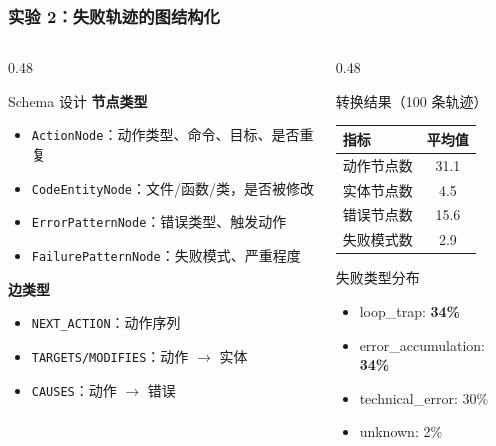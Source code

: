 \documentclass[aspectratio=169,10pt]{beamer}
\renewcommand{\footnotesize}{\tiny}
\begin{document}
\begin{frame}
  \frametitle{实验 2：失败轨迹的图结构化}

  \begin{columns}[T]
    \begin{column}{0.48\textwidth}
      \begin{block}{Schema 设计}
        \textbf{节点类型}
        \begin{itemize}
          \item \texttt{ActionNode}：动作类型、命令、目标、是否重复
          \item \texttt{CodeEntityNode}：文件/函数/类，是否被修改
          \item \texttt{ErrorPatternNode}：错误类型、触发动作
          \item \texttt{FailurePatternNode}：失败模式、严重程度
        \end{itemize}

        \textbf{边类型}
        \begin{itemize}
          \item \texttt{NEXT\_ACTION}：动作序列
          \item \texttt{TARGETS/MODIFIES}：动作 $\rightarrow$ 实体
          \item \texttt{CAUSES}：动作 $\rightarrow$ 错误
        \end{itemize}
      \end{block}
    \end{column}

    \begin{column}{0.48\textwidth}
      \begin{block}{转换结果（100 条轨迹）}
        \footnotesize
        \begin{tabular}{l|c}
          \textbf{指标} & \textbf{平均值} \\
          \hline
          动作节点数 & 31.1 \\
          实体节点数 & 4.5 \\
          错误节点数 & 15.6 \\
          失败模式数 & 2.9 \\
        \end{tabular}
      \end{block}

      \begin{block}{失败类型分布}
        \begin{itemize}
          \item loop\_trap: \textbf{34\%}
          \item error\_accumulation: \textbf{34\%}
          \item technical\_error: 30\%
          \item unknown: 2\%
        \end{itemize}
      \end{block}


\end{column}
\end{columns}
\end{frame}
\end{document}
